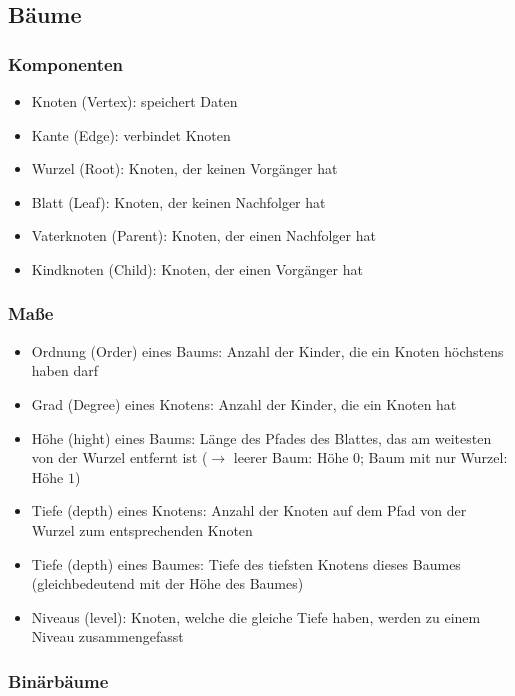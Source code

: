 \documentclass{article}
\begin{document}
	\subsection{Bäume}
	
	\subsubsection{Komponenten}
	
	\begin{itemize}
		\item Knoten (Vertex): speichert Daten
		\item Kante (Edge): verbindet Knoten
		\item Wurzel (Root): Knoten, der keinen Vorgänger hat
		\item Blatt (Leaf): Knoten, der keinen Nachfolger hat
		\item Vaterknoten (Parent): Knoten, der einen Nachfolger hat
		\item Kindknoten (Child): Knoten, der einen Vorgänger hat
	\end{itemize}
	
	\subsubsection{Maße}
	
	\begin{itemize}
		\item Ordnung (Order) eines Baums: Anzahl der Kinder, die ein Knoten höchstens haben darf
		\item Grad (Degree) eines Knotens: Anzahl der Kinder, die ein Knoten hat
		\item Höhe (hight) eines Baums: Länge des Pfades des Blattes, das am weitesten von der Wurzel entfernt ist ($\rightarrow$ leerer Baum: Höhe $0$; Baum mit nur Wurzel: Höhe $1$)
		\item Tiefe (depth) eines Knotens: Anzahl der Knoten auf dem Pfad von der Wurzel zum entsprechenden Knoten
		\item Tiefe (depth) eines Baumes: Tiefe des tiefsten Knotens dieses Baumes (gleichbedeutend mit der Höhe des Baumes)
		\item Niveaus (level): Knoten, welche die gleiche Tiefe haben, werden zu einem Niveau zusammengefasst
	\end{itemize}
	
	\subsubsection{Binärbäume}
	
\end{document}
